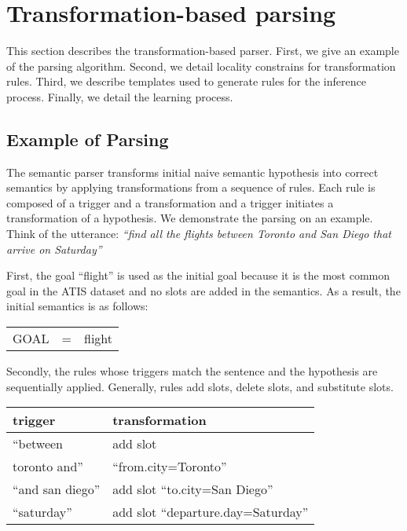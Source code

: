 \documentclass{article}
\begin{document}
\section{Transformation-based parsing} \label{sec:tbl}
This section describes the transformation-based parser. 
First, we give an example of the parsing algorithm. 
Second, we detail locality constrains for transformation rules.
Third, we describe templates used to generate rules for the inference process. 
Finally, we detail the learning process. 

\subsection{Example of Parsing} \label{sec:tbl:example}
The semantic parser transforms initial naive semantic hypothesis into correct semantics by applying transformations from a sequence of rules. Each rule is composed of a trigger and a transformation and a trigger initiates a transformation of a hypothesis. 
We demonstrate the parsing on an example. Think of the utterance: \textit{``find all the flights between Toronto and San Diego that arrive on Saturday''} 

First, the goal ``flight'' is used as the initial goal because it is the most common goal in the ATIS dataset and no slots are added in the semantics. As a result, the initial semantics is as follows:

\vspace{.15cm}
\begin{tabular}{lll}
  GOAL & = & flight
\end{tabular} 
\vspace{.15cm}

Secondly, the rules whose triggers match the sentence and the hypothesis are sequentially applied. Generally, rules add slots, delete slots, and substitute slots. 

\vspace{.15cm}
\begin{tabular}{ll}
  trigger & transformation \\
  \hline 
  ``between               & add slot \\
    toronto and''         &``from.city=Toronto'' \\
  ``and san diego''       & add slot ``to.city=San Diego'' \\
  ``saturday''            & add slot ``departure.day=Saturday'' \\
\end{tabular} 
\vspace{.15cm}
\end{document}
